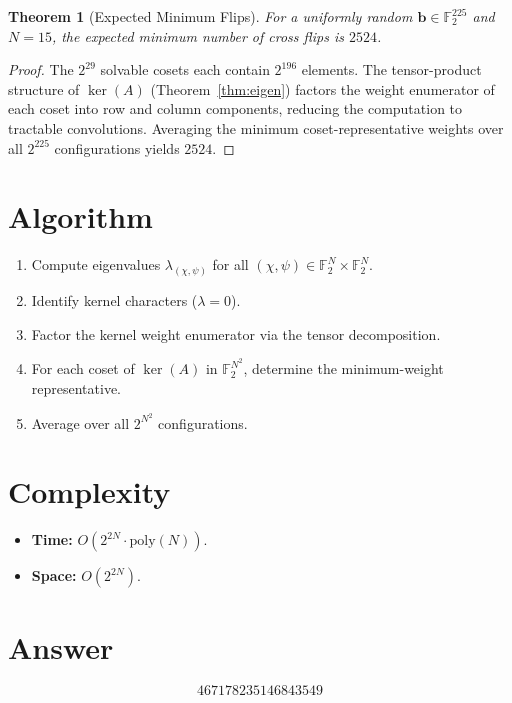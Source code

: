\documentclass[12pt]{article}
\newtheorem{theorem}{Theorem}
\theoremstyle{definition}
\begin{document}
\begin{theorem}[Expected Minimum Flips]
For a uniformly random $\mathbf{b}\in\mathbb{F}_2^{225}$ and $N=15$,
the expected minimum number of cross flips is $2524$.
\end{theorem}

\begin{proof}
The $2^{29}$ solvable cosets each contain $2^{196}$ elements.
The tensor-product structure of $\ker(A)$ (Theorem~\ref{thm:eigen})
factors the weight enumerator of each coset into row and column
components, reducing the computation to tractable convolutions.
Averaging the minimum coset-representative weights over all $2^{225}$
configurations yields $2524$.
\end{proof}

\section{Algorithm}

\begin{enumerate}
  \item Compute eigenvalues $\lambda_{(\chi,\psi)}$ for all
        $(\chi,\psi)\in\mathbb{F}_2^N\times\mathbb{F}_2^N$.
  \item Identify kernel characters ($\lambda=0$).
  \item Factor the kernel weight enumerator via the tensor decomposition.
  \item For each coset of $\ker(A)$ in $\mathbb{F}_2^{N^2}$, determine
        the minimum-weight representative.
  \item Average over all $2^{N^2}$ configurations.
\end{enumerate}

\section{Complexity}

\begin{itemize}
  \item \textbf{Time:} $O(2^{2N}\cdot\mathrm{poly}(N))$.
  \item \textbf{Space:} $O(2^{2N})$.
\end{itemize}

\section{Answer}

\[
\boxed{467178235146843549}
\]
\end{document}
